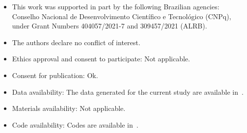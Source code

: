 \documentclass[pdflatex,sn-mathphys-num,iicol]{sn-jnl}%
\theoremstyle{thmstyleone}%
\theoremstyle{thmstyletwo}%
\theoremstyle{thmstylethree}%
\begin{document}
\begin{itemize}

\item This work was supported in part by the following Brazilian agencies: Conselho Nacional de Desenvolvimento Cient\'ifico e Tecnol\'ogico (CNPq), under Grant Numbers 404057/2021-7 and 309457/2021 (ALRB).
\item The authors declare no conflict of interest.
\item Ethics approval and consent to participate: Not applicable.
\item Consent for publication: Ok.
\item Data availability: The data generated for the current study are available in~\cite{qui:2026rep}.
\item Materials availability: Not applicable.
\item Code availability: Codes are available in~\cite{qui:2026rep}.

\end{itemize}

\end{document}

